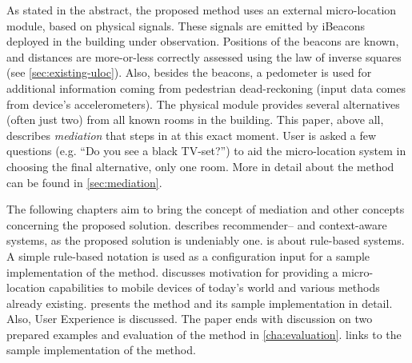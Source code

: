 As stated in the abstract, the proposed method uses an external micro-location module, based on physical signals. These signals are emitted by iBeacons deployed in the building under observation. Positions of the beacons are known, and distances are more-or-less correctly assessed using the law of inverse squares (see \cref{sec:existing-uloc}). Also, besides the beacons, a pedometer is used for additional information coming from pedestrian dead-reckoning (input data comes from device's accelerometers). The physical module provides several alternatives (often just two) from all known rooms in the building. This paper, above all, describes \emph{mediation} that steps in at this exact moment. User is asked a few questions (e.g. ``Do you see a black TV-set?'') to aid the micro-location system in choosing the final alternative, only one room. More in detail about the method can be found in \cref{sec:mediation}.


The following chapters aim to bring the concept of mediation and other concepts concerning the proposed solution.  describes recommender-- and context-aware systems, as the proposed solution is undeniably one.  is about rule-based systems. A simple rule-based notation is used as a configuration input for a sample implementation of the method.  discusses motivation for providing a micro-location capabilities to mobile devices of today's world and various methods already existing.  presents the method and its sample implementation in detail. Also, User Experience is discussed. The paper ends with discussion on two prepared examples and evaluation of the method in \cref{cha:evaluation}.  links to the sample implementation of the method.
